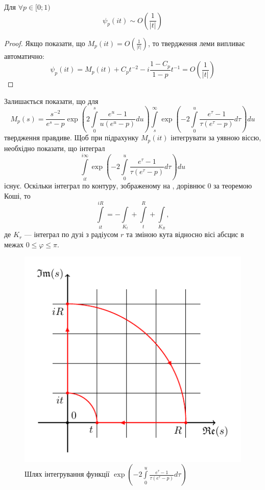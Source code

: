 \begin{lem}
Для $\forall p \in [0; 1)$
\begin{equation}
\psi_{p}(it) \sim O\left(\frac{1}{|t|}\right)
\end{equation}
\begin{proof}
Якщо показати, що $M_{p}(it) = O\left(\frac{1}{|t|}\right)$, то твердження леми випливає автоматично:
\begin{equation*}
\psi_{p}(it)=M_{p}(it) + C_{p} t^{-2} - i \frac{1-C_{p}}{1 - p} t^{-1} = O\left(\frac{1}{|t|}\right)
\end{equation*}
\end{proof}
Залишається показати, що для
\begin{equation*}
M_{p}(s) = \frac{s^{-2}}{e^s-p} \exp \left(2 \int\limits_{0}^{s} \frac{e^u -1}{u(e^u - p)} du\right) \int\limits_s^\infty \exp\left(-2 \int\limits_{0}^{u} \frac{e^\tau -1}{\tau(e^\tau - p)} d\tau\right) du 
\end{equation*}
твердження правдиве. Щоб при підрахунку $M_{p}(it)$ інтегрувати за уявною віссю, необхідно показати, що інтеграл
\begin{equation*}
\int\limits_{it}^{i\infty} \exp\left(-2 \int\limits_{0}^{u} \frac{e^\tau -1}{\tau(e^\tau - p)} d\tau\right) du 
\end{equation*}
існує. Оскільки інтеграл по контуру, зображеному на , дорівнює 0 за теоремою Коші, то
\begin{equation*}
\int\limits_{it}^{iR} = -\int\limits_{K_{t}} + \int\limits_{t}^{R} + \int\limits_{K_{R}},
\end{equation*}
де $K_{r}$ --- інтеграл по дузі з радіусом $r$ та зміною кута відносно вісі абсцис в межах $0 \leq \varphi \leq \pi$.
\begin{figure}[h]
	\centering
	\includegraphics{chapter_Asymptotics/img/contour_quarter}
	\caption{Шлях інтегрування функції $\exp\left(-2 \int\limits_{0}^{u} \frac{e^\tau -1}{\tau(e^\tau - p)} d\tau\right)$}
	\label{fig:contour_phi}
\end{figure}


\end{lem}
